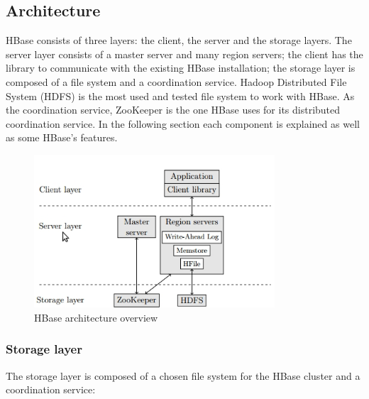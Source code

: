 \subsection{Architecture}

HBase consists of three layers: the client, the server and the storage layers. The server layer consists of a master server and many region servers; the client has the library to communicate with the existing HBase installation; the storage layer is composed of a file system and a coordination service. Hadoop Distributed File System (HDFS) is the most used and tested file system to work with HBase. As the coordination service, ZooKeeper is the one HBase uses for its distributed coordination service. In the following section each component is explained as well as some HBase's features.

\begin{figure}[htb]
\centering
\includegraphics[width=0.8\textwidth]{./images/HBaseLayers.jpg}
\caption{HBase architecture overview} \label{fig:hbaselayers}
\end{figure}


\subsubsection{Storage layer}

The storage layer is composed of a chosen file system for the HBase cluster and a coordination service:

